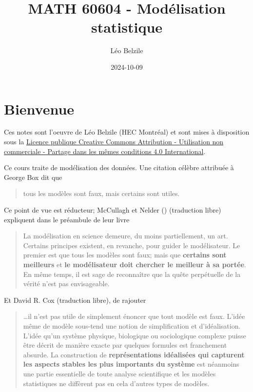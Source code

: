 \documentclass[
  11pt,
  letterpaper,
]{scrbook}
\title{MATH 60604 - Modélisation statistique}
\author{Léo Belzile}
\date{2024-10-09}
\renewcommand*\contentsname{Table des matières}
\newcommand\contentsname{Table des matières}
\theoremstyle{definition}
\theoremstyle{definition}
\theoremstyle{plain}
\theoremstyle{plain}
\theoremstyle{remark}
\begin{document}


\renewcommand*\contentsname{Table des matières}
{
\setcounter{tocdepth}{2}
\tableofcontents
}

\mainmatter
{}

\chapter*{Bienvenue}\label{bienvenue}


Ces notes sont l'oeuvre de Léo Belzile (HEC Montréal) et sont mises à
disposition sous la
\href{https://creativecommons.org/licenses/by-nc-sa/4.0/legalcode.fr}{Licence
publique Creative Commons Attribution - Utilisation non commerciale -
Partage dans les mêmes conditions 4.0 International}.

Ce cours traite de modélisation des données. Une citation célèbre
attribuée à George Box dit que

\begin{quote}
tous les modèles sont faux, mais certains sont utiles.
\end{quote}

Ce point de vue est réducteur; McCullagh et Nelder
() (traduction libre)
expliquent dans le préambule de leur livre

\begin{quote}
La modélisation en science demeure, du moins partiellement, un art.
Certains principes existent, en revanche, pour guider le modélisateur.
Le premier est que tous les modèles sont faux; mais que \textbf{certains
sont meilleurs} et \textbf{le modélisateur doit chercher le meilleur à
sa portée}. En même temps, il est sage de reconnaître que la quête
perpétuelle de la vérité n'est pas envisageable.
\end{quote}

Et David R. Cox (traduction libre), de rajouter

\begin{quote}
\ldots il n'est pas utile de simplement énoncer que tout modèle est
faux. L'idée même de modèle sous-tend une notion de simplification et
d'idéalisation. L'idée qu'un système physique, biologique ou
sociologique complexe puisse être décrit de manière exacte par quelques
formules est franchement absurde. La construction de
\textbf{représentations idéalisées qui capturent les aspects stables les
plus importants du système} est néanmoins une partie essentielle de
toute analyse scientifique et les modèles statistiques ne diffèrent pas
en cela d'autres types de modèles.
\end{quote}
\end{document}
